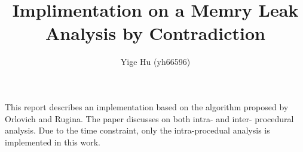 \documentclass[12pt]{article}
\title{\bf \Large Implimentation on a Memry Leak Analysis by Contradiction}
\author{\normalsize Yige Hu (yh66596)}
\date{}
\begin{document}
\maketitle


This report describes an implementation based on the algorithm proposed by
Orlovich and Rugina\cite{rugina}. The paper discusses on both intra- and
inter- procedural analysis. Due to the time constraint, only the
intra-procedual analysis is implemented in this work.\\ \\

%

%

%

%
%
%


\footnotesize


\end{document}
